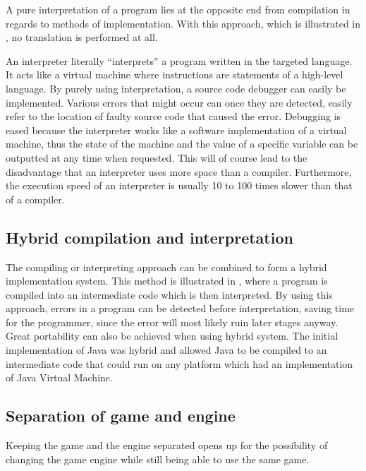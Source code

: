 A pure interpretation of a program lies at the opposite end from compilation in
regards to methods of implementation. With this approach, which is illustrated in
, no translation is performed at all.



An interpreter literally ``interprets'' a program written in the targeted language. It
acts like a virtual machine where instructions are statements of a high-level
language. By purely using interpretation, a source code debugger can easily be
implemented. Various errors that might occur can once they are detected, easily
refer to the location of faulty source code that caused the error. Debugging is
eased because the interpreter works like a software implementation of a virtual
machine, thus the state of the machine and the value of a specific variable can
be outputted at any time when requested. This will of course lead to the
disadvantage that an interpreter uses more space than a compiler. Furthermore,
the execution speed of an interpreter is usually 10 to 100 times slower than
that of a compiler\cite[p. 48]{sebesta2013}.

\subsection{Hybrid compilation and interpretation}
The compiling or interpreting approach can be combined to form
a hybrid implementation system. This method is illustrated in
, where a program is compiled into
an intermediate code which is then interpreted. By using this approach,
errors in a program can be detected before interpretation, saving time
for the programmer, since the error will most likely ruin later stages
anyway. Great portability can also be achieved when using hybrid system.
The initial implementation of Java was hybrid and allowed Java to be
compiled to an intermediate code that could run on any platform which
had an implementation of Java Virtual Machine\cite[p. 50]{sebesta2013}.



\subsection{Separation of game and engine}
\label{subsec:engineseperation}
Keeping the game and the engine separated opens up for the possibility of
changing the game engine while still being able to use the same game. 


